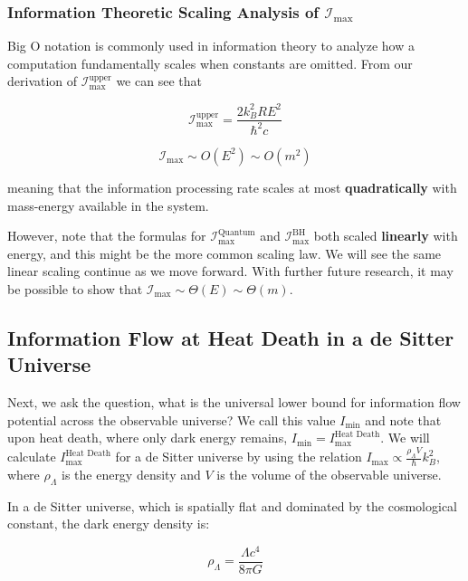 \documentclass[12pt]{article}
\begin{document}
\subsubsection{Information Theoretic Scaling Analysis of $\mathcal{I}_{\max}$}

Big O notation is commonly used in information theory to analyze how a computation fundamentally scales when constants are omitted. From our derivation of $\mathcal{I}_{\text{max}}^{\text{upper}}$ we can see that

\[
\mathcal{I}_{\text{max}}^{\text{upper}} =\frac{2 k_B^2 R E^2}{\hbar^2 c}
\]

\begin{equation}
    \mathcal{I}_{\max} \sim O(E^2) \sim O(m^2)
\end{equation}

meaning that the information processing rate scales at most \textbf{quadratically} with mass-energy available in the system.

However, note that the formulas for $\mathcal{I}_{\text{max}}^{\text{Quantum}}$ and $\mathcal{I}_{\text{max}}^{\text{BH}}$ both scaled \textbf{linearly} with energy, and this might be the more common scaling law. We will see the same linear scaling continue as we move forward. With further future research, it may be possible to show that $\mathcal{I}_{\max} \sim \Theta(E) \sim \Theta(m)$.


\subsection{Information Flow at Heat Death in a de Sitter Universe}

Next, we ask the question, what is the universal lower bound for information flow potential across the observable universe? We call this value $I_{\text{min}}$ and note that upon heat death, where only dark energy remains, $I_{\text{min}} = I_{\text{max}}^{\text{Heat Death}}$. We will calculate $I_{\text{max}}^{\text{Heat Death}}$ for a de Sitter universe by using the relation $I_{\text{max}} \propto \frac{\rho_\Lambda V}{\hbar} k_B^2$, where $\rho_\Lambda$ is the energy density and $V$ is the volume of the observable universe.

In a de Sitter universe, which is spatially flat and dominated by the cosmological constant, the dark energy density is:

\begin{equation}
    \rho_\Lambda = \frac{\Lambda c^4}{8 \pi G}
\end{equation}
\end{document}
